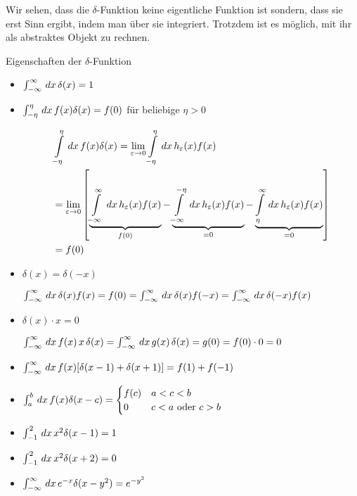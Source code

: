 Wir sehen, dass die $\delta$-Funktion keine eigentliche Funktion ist sondern,
dass sie erst Sinn ergibt, indem man über sie integriert. Trotzdem ist es
möglich, mit ihr als abstraktes Objekt zu rechnen.
\par
Eigenschaften der $\delta$-Funktion
\begin{itemize}
  \item $\int_{-\infty}^{\infty}\,dx\,\delta(x) = 1$
  \item $\int_{-\eta}^{\eta}\,dx\, f(x)\delta(x) = f(0)$ für beliebige $\eta > 0$
  \par
  \begin{info}
\begin{align*}
&\int \limits_{-\eta}^{\eta}\,dx\, f(x)\delta(x) = \lim_{\varepsilon\to0} \int
\limits_{-\eta}^{\eta}\,dx\, h_{\varepsilon}(x)f(x) \\
&= \lim_{\varepsilon\to0}\left[\underbrace{\int \limits_{-\infty}^{\infty}\,dx\,
h_{\varepsilon}(x)f(x)}_{f(0)} - \underbrace{\int \limits_{-\infty}^{-\eta}\,dx\,
h_{\varepsilon}(x)f(x)}_{=0} - \underbrace{\int \limits_{\eta}^{\infty}\,dx\,
h_{\varepsilon}(x)f(x)}_{=0}\right]\\
&= f(0)
\end{align*}
\end{info}
\item $\delta(x) = \delta(-x)$\\
\begin{info}
$\int_{-\infty}^{\infty} \,dx\, \delta(x)f(x) = f(0) = \int_{-\infty}^{\infty}
\,dx\, \delta(x)f(-x) = \int_{-\infty}^{\infty} \,dx\, \delta(-x)f(x)$
\end{info}
\item $\delta(x)\cdot x = 0$\\
\begin{info} $\int_{-\infty}^{\infty} \,dx\, f(x)\,x\,\delta(x) = 
\int_{-\infty}^{\infty} \,dx\, g(x)\,\delta(x) = g(0) = f(0)\cdot 0 = 0$ 
\end{info}
\end{itemize}

\begin{Beispiel}
\par
\begin{itemize}
  \item $\int_{-\infty}^{\infty} \,dx\, f(x)[\delta(x-1)+\delta(x+1)] = f(1)+f(-1)$
  \item $\int_{a}^{b} \,dx\, f(x) \delta(x-c) = \begin{cases}f(c) & a
< c < b\\0 & c < a \text{ oder } c > b\end{cases}$
\item $\int_{-1}^{2}\,dx\, x^2 \delta(x-1) = 1$
\item $\int_{-1}^{2}\,dx\, x^2\delta(x+2) = 0$
\item $\int_{-\infty}^{\infty}\,dx\, e^{-x} \delta(x-y^2) = e^{-y^2}$
\end{itemize}
\end{Beispiel}

